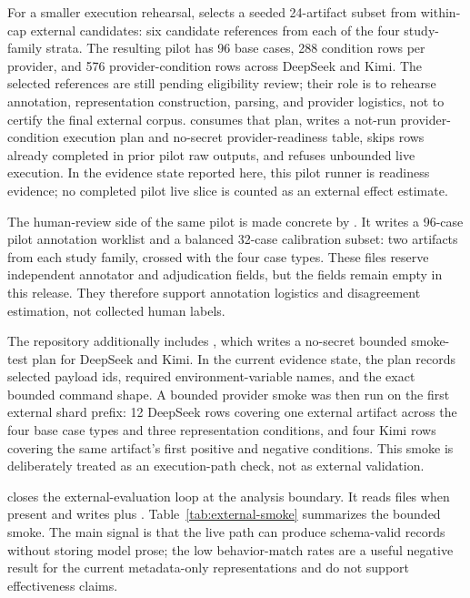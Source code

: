 \documentclass[11pt]{article}
\begin{document}
For a smaller execution rehearsal, 
selects a seeded 24-artifact subset from within-cap external candidates: six
candidate references from each of the four study-family strata. The resulting
pilot has 96 base cases, 288 condition rows per provider, and 576
provider-condition rows across DeepSeek and Kimi. The selected references are
still pending eligibility review; their role is to rehearse annotation,
representation construction, parsing, and provider logistics, not to certify
the final external corpus.
 consumes that plan, writes a
not-run provider-condition execution plan and no-secret provider-readiness
table, skips rows already completed in prior pilot raw outputs, and refuses
unbounded live execution. In the evidence state reported here, this pilot
runner is readiness evidence; no completed pilot live slice is counted as an
external effect estimate.

The human-review side of the same pilot is made concrete by
. It writes a
96-case pilot annotation worklist and a balanced 32-case calibration subset:
two artifacts from each study family, crossed with the four case types. These
files reserve independent annotator and adjudication fields, but the fields
remain empty in this release. They therefore support annotation logistics and
disagreement estimation, not collected human labels.

The repository additionally includes
, which writes a no-secret
bounded smoke-test plan for DeepSeek and Kimi. In the current evidence state,
the plan records selected payload ids, required environment-variable names,
and the exact bounded command shape. A bounded provider smoke was then run on
the first external shard prefix: 12 DeepSeek rows covering one external
artifact across the four base case types and three representation conditions,
and four Kimi rows covering the same artifact's first positive and negative
conditions. This smoke is deliberately treated as an execution-path check, not
as external validation.

 closes the external-evaluation
loop at the analysis boundary. It reads
 files when present
and writes  plus
. Table~\ref{tab:external-smoke}
summarizes the bounded smoke. The main signal is that the live path can produce
schema-valid records without storing model prose; the low behavior-match rates
are a useful negative result for the current metadata-only representations and
do not support effectiveness claims.
\end{document}
